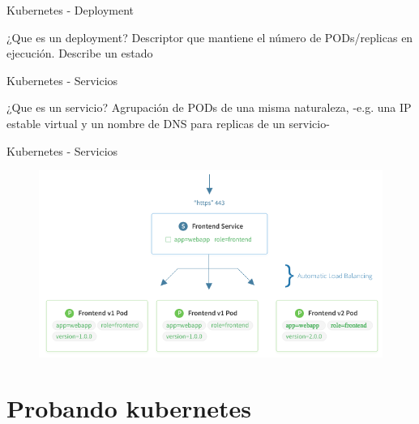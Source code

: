 \documentclass[aspectratio=169]{beamer}
\begin{document}
\begin{frame}{Kubernetes - Deployment}

    \begin{alertblock}{¿Que es un deployment?}
        Descriptor que mantiene el número de PODs/replicas en ejecución. Describe un estado
    \end{alertblock}


\end{frame}


\begin{frame}{Kubernetes - Servicios}

    \begin{alertblock}{¿Que es un servicio?}
        Agrupación de PODs de una misma naturaleza, -e.g. una IP estable virtual y un nombre de DNS para replicas de un servicio-
    \end{alertblock}


\end{frame}

\begin{frame}{Kubernetes - Servicios}
    \begin{figure}
        \centering
        \includegraphics[width=0.65\linewidth]{Images/kubernetesservice.png}
    \end{figure}
\end{frame}




{
    \section{Probando kubernetes}
}
\end{document}
